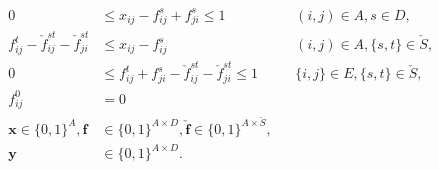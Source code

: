 \begin{subequations}
\begin{flalign}
  		    \label{con:mfinpf2:xbound} 0&\leq x_{ij}-f_{ij}^s+f_{ji}^s  \leq 1 && (i,j)\in A,  s\in D, \\
           \label{con:mfinpf2:fcap}   f^t_{ij} - \check{f}^{st}_{ij} - \check{f}^{st}_{ji} &\leq  x_{ij}-f^s_{ij}   && (i,j)\in A, \{s,t\}\in \check{S}, && &\\ 		 			 
\label{con:mfinpf2:fbound} 0&\leq f_{ij}^t+f_{ji}^s-\check{f}_{ij}^{st}-\check{f}_{ji}^{st}  \leq 1 && \{i,j\}\in E,\{s,t\}\in \check{S}, \\
\label{con:mfinpf2:fij00} f^0_{ij}&=0&&\\
		    \label{con:mfinpf2:dim}	\mathbf{x} \in \{0,1\}^{A},\mathbf{f}&\in\{0,1\}^{A \times D},\mathbf{\check{f}}\in\{0,1\}^{A\times \check{S}}, \\ 
		    \label{con:mfinpf2:dimy}\mathbf{y}&\in \{0,1\}^{A\times D}.
    \end{flalign}
    \end{subequations}  


